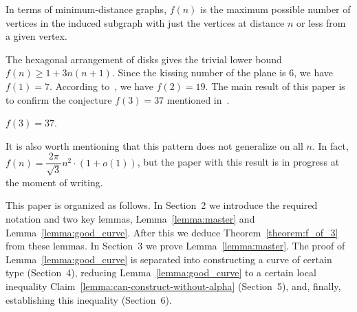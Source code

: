 In terms of minimum-distance graphs, $f(n)$ is the maximum possible number of vertices in the induced subgraph with just the vertices at distance $n$ or less from a given vertex. %

The hexagonal arrangement of disks gives the trivial lower bound $f(n) \geq 1 + {3n(n+1)}.$ Since the kissing number of the plane is $6$, we have $f(1) = 7$. According to~\cite{toth_heppes}, we have $f(2) = 19$. The main result of this paper is to confirm the conjecture $f(3) = 37$ mentioned in~\cite{furedi}.

\begin{theorem}\label{theorem:f_of_3} $f(3) = 37$.
\end{theorem}




It is also worth mentioning that this pattern does not generalize on all $n$. In fact, $f(n) = \dfrac{2\pi}{\sqrt{3}}n^2\cdot(1 + o(1))$, but the paper with this result is in progress at the moment of writing.

This paper is organized as follows. In Section~2 we introduce the required notation and two key lemmas, Lemma~\ref{lemma:master} and Lemma~\ref{lemma:good_curve}. After this we deduce Theorem~\ref{theorem:f_of_3} from these lemmas. In Section~3 we prove Lemma~\ref{lemma:master}. The proof of Lemma~\ref{lemma:good_curve} is separated into constructing a curve of certain type (Section~4), reducing Lemma~\ref{lemma:good_curve} to a certain local inequality Claim~\ref{lemma:can-construct-without-alpha} (Section~5), and, finally, establishing this inequality (Section~6).


